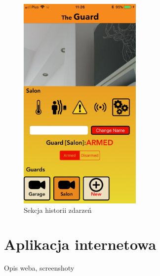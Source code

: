 \begin{figure}[h]
	\centering
	\includegraphics[width=6cm]{settings.png}
	\caption{Sekcja historii zdarzeń}
\end{figure}








\section*{Aplikacja internetowa}

Opis weba, screenshoty